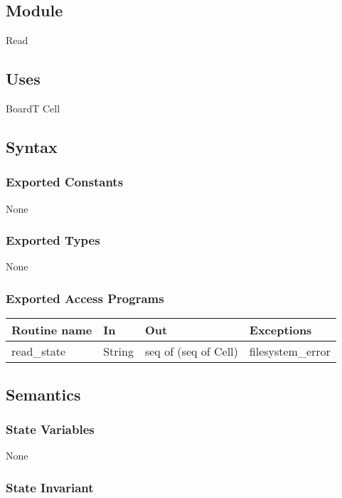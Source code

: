\documentclass[12pt]{article}
\begin{document}
\subsection*{Module}

Read

\subsection* {Uses}

BoardT
Cell

\subsection* {Syntax}

\subsubsection* {Exported Constants}

None

\subsubsection* {Exported Types}

None

\subsubsection* {Exported Access Programs}

\begin{tabular}{| l | l | l | p{5cm} |}
\hline
\textbf{Routine name} & \textbf{In} & \textbf{Out} & \textbf{Exceptions}\\
\hline
read\_state & String & seq of (seq of Cell) & filesystem\_error\\
\hline
\end{tabular}

\subsection* {Semantics}

\subsubsection* {State Variables}

None

\subsubsection* {State Invariant}
\end{document}
